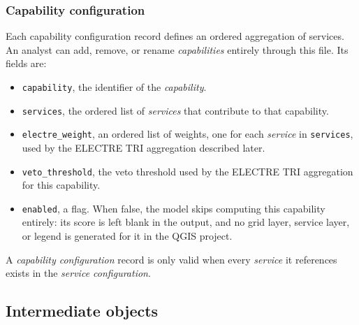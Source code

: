 \documentclass{article}
\begin{document}
\subsubsection*{Capability configuration}
    Each capability configuration record defines an ordered aggregation of
    services. An analyst can add, remove, or rename \emph{capabilities}
    entirely through this file. Its fields are:
    \begin{itemize}
        \item \texttt{capability}, the identifier of the \emph{capability}.
        \item \texttt{services}, the ordered list of \emph{services} that contribute to that capability.
        \item \texttt{electre\_weight}, an ordered list of weights, one for each
        \emph{service} in \texttt{services}, used by the ELECTRE TRI aggregation
        described later.
        \item \texttt{veto\_threshold}, the veto threshold used by the ELECTRE
        TRI aggregation for this capability.
        \item \texttt{enabled}, a flag. When false, the model skips computing
        this capability entirely: its score is left blank in the output, and no
        grid layer, service layer, or legend is generated for it in the QGIS
        project.
    \end{itemize}
    A \emph{capability configuration} record is only valid when every
    \emph{service} it references exists in the \emph{service configuration}.



\subsection{Intermediate objects}
\end{document}
